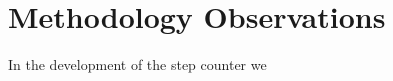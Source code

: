 \section{Methodology Observations}\label{sec:stepCounterMethodology}

In the development of the step counter we 